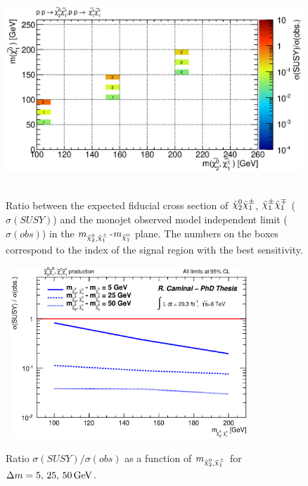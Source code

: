 \begin{figure}[!ht]
\begin{center}
\mbox{
\includegraphics[width=0.995\textwidth]{Interpretations/Figures/NN-NC_grid.eps}
}
\end{center}
\caption[Ratio between the expected fiducial cross section of $\ninotwo \chinoonepm$, $\chinoonepm \chinoonemp$ and the monojet observed model independent limit in the $m_{\ninotwo , \chinoonepm}$-$m_{\ninoone}$ plane.]{Ratio between the expected fiducial cross section of $\ninotwo \chinoonepm$, $\chinoonepm \chinoonemp$ ($\sigma (SUSY)$) and the monojet observed model independent limit ($\sigma (obs)$) in the $m_{\ninotwo , \chinoonepm}$-$m_{\ninoone}$ plane. The numbers on the boxes correspond to the index of the signal region with the best sensitivity.}
\label{fig:NeutralinoNeutralinoBestRegion}
\end{figure}

\begin{figure}[!ht]
\begin{center}
\mbox{
\includegraphics[width=0.795\textwidth]{Interpretations/Figures/NN-NC_best.eps}
}
\end{center}
\caption[Ratio $\sigma (SUSY) / \sigma (obs)$ as a function of $m_{\ninotwo , \chinoonepm}$ for $\Delta m = 5, 25, 50$~GeV.]{Ratio $\sigma (SUSY) / \sigma (obs)$ as a function of $m_{\ninotwo , \chinoonepm}$ for $\Delta m = \unit[5,\, 25,\, 50]{GeV}$.}
\label{fig:NeutralinoNeutralinoLimits}
\end{figure}
